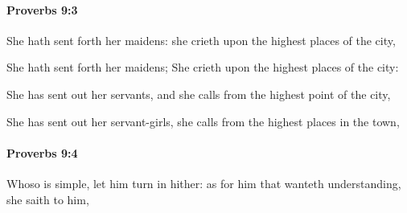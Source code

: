 		\paragraph{Proverbs 9:3} %
			\label{PROVERBS-9-3}

			She hath sent forth her maidens: she crieth upon the highest places of the city,

			\begin{versebox}
					\item[BHS] 
					\item[ASV] She hath sent forth her maidens; She crieth upon the highest places of the city:
					\item[NIV] She has sent out her servants, and she calls from the highest point of the city,
					\item[NRSV] She has sent out her servant-girls, she calls from the highest places in the town,
			\end{versebox}

		\paragraph{Proverbs 9:4} %
			\label{PROVERBS-9-4}

			Whoso is simple, let him turn in hither: as for him that wanteth understanding, she saith to him,

